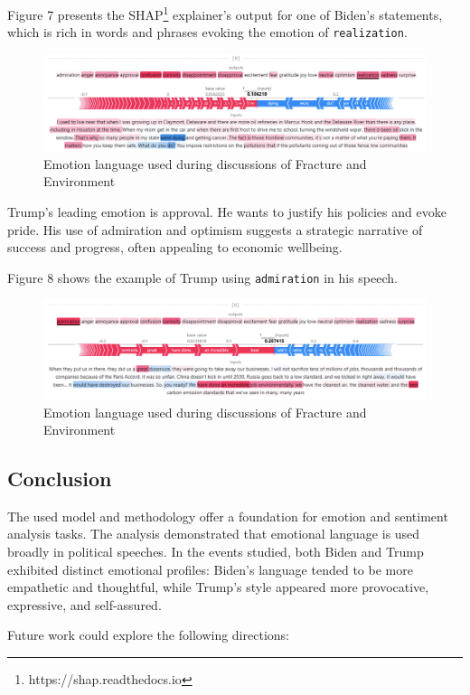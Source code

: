 \documentclass[pdflatex,sn-mathphys-num]{sn-jnl}%
\begin{document}
Figure 7 presents the SHAP\footnote{https://shap.readthedocs.io} explainer’s output for one of Biden’s statements, which is rich in words and phrases evoking the emotion of \texttt{realization}.

\begin{figure}[H]
	\centering
	\includegraphics[width=12cm]{f7-explainer_realization.png}
	\caption{Emotion language used during discussions of Fracture and Environment}
\end{figure}

Trump's leading emotion is approval. He wants to justify his policies and evoke pride. His use of admiration and optimism suggests a strategic narrative of success and progress, often appealing to economic wellbeing.

Figure 8 shows the example of Trump using \texttt{admiration} in his speech.

\begin{figure}[H]
	\centering
	\includegraphics[width=12cm]{f8-explainer_admiration.png}
	\caption{Emotion language used during discussions of Fracture and Environment}
\end{figure}

\subsection{Conclusion}

The used model and methodology offer a foundation for emotion and sentiment analysis tasks.
The analysis demonstrated that emotional language is used broadly in political speeches. In the events studied, both Biden and Trump exhibited distinct emotional profiles: Biden’s language tended to be more empathetic and thoughtful, while Trump’s style appeared more provocative, expressive, and self-assured.

Future work could explore the following directions:
\end{document}
